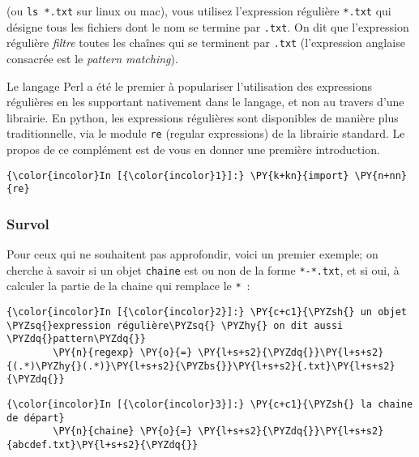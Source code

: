 (ou \texttt{ls\ *.txt} sur linux ou mac), vous utilisez l'expression
régulière \texttt{*.txt} qui désigne tous les fichiers dont le nom se
termine par \texttt{.txt}. On dit que l'expression régulière
\emph{filtre} toutes les chaînes qui se terminent par \texttt{.txt}
(l'expression anglaise consacrée est le \emph{pattern matching}).

    Le langage Perl a été le premier à populariser l'utilisation des
expressions régulières en les supportant nativement dans le langage, et
non au travers d'une librairie. En python, les expressions régulières
sont disponibles de manière plus traditionnelle, via le module
\texttt{re} (regular expressions) de la librairie standard. Le propos de
ce complément est de vous en donner une première introduction.

    \begin{Verbatim}[commandchars=\\\{\},frame=single,framerule=0.3mm,rulecolor=\color{cellframecolor}]
{\color{incolor}In [{\color{incolor}1}]:} \PY{k+kn}{import} \PY{n+nn}{re}
\end{Verbatim}


    \hypertarget{survol}{%
\subsubsection{Survol}\label{survol}}

    Pour ceux qui ne souhaitent pas approfondir, voici un premier exemple;
on cherche à savoir si un objet \texttt{chaine} est ou non de la forme
\texttt{*-*.txt}, et si oui, à calculer la partie de la chaine qui
remplace le \texttt{*}~:

    \begin{Verbatim}[commandchars=\\\{\},frame=single,framerule=0.3mm,rulecolor=\color{cellframecolor}]
{\color{incolor}In [{\color{incolor}2}]:} \PY{c+c1}{\PYZsh{} un objet \PYZsq{}expression régulière\PYZsq{} \PYZhy{} on dit aussi \PYZdq{}pattern\PYZdq{}}
        \PY{n}{regexp} \PY{o}{=} \PY{l+s+s2}{\PYZdq{}}\PY{l+s+s2}{(.*)\PYZhy{}(.*)}\PY{l+s+s2}{\PYZbs{}}\PY{l+s+s2}{.txt}\PY{l+s+s2}{\PYZdq{}}
\end{Verbatim}


    \begin{Verbatim}[commandchars=\\\{\},frame=single,framerule=0.3mm,rulecolor=\color{cellframecolor}]
{\color{incolor}In [{\color{incolor}3}]:} \PY{c+c1}{\PYZsh{} la chaine de départ}
        \PY{n}{chaine} \PY{o}{=} \PY{l+s+s2}{\PYZdq{}}\PY{l+s+s2}{abcdef.txt}\PY{l+s+s2}{\PYZdq{}}
\end{Verbatim}


